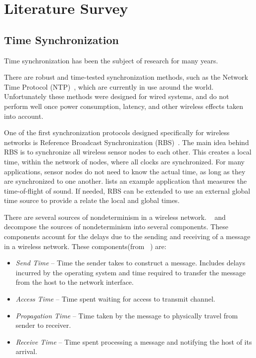 \section{Literature Survey}\label{section:litsurvey}
\subsection{Time Synchronization}
Time synchronization has been the subject of research for many years.

There are robust and time-tested synchronization methods, such as the Network Time Protocol (NTP)~\cite{synchronization:NTP}, which are currently in use around the world. Unfortunately these methods were designed for wired systems, and do not perform well once power consumption, latency, and other wireless effects taken into account. 

One of the first synchronization protocols designed specifically for wireless networks is Reference Broadcast Synchronization (RBS)~\cite{synchronization:RBS}. The main idea behind RBS is to synchronize all wireless sensor nodes to each other. This creates a local time, within the network of nodes, where all clocks are synchronized. For many applications, sensor nodes do not need to know the actual time, as long as they are synchronized to one another. \cite{synchronization:RBS} lists an example application that measures the time-of-flight of sound. If needed, RBS can be extended to use an external global time source to provide a relate the local and global times.

There are several sources of nondeterminism in a wireless network. ~\cite{synchronization:RBS} and ~\cite{synchronization:FTSP} decompose the sources of nondeterminism into several components. These components account for the delays due to the sending and receiving of a message in a wireless network. These components(from ~\cite{synchronization:RBS}) are: 
\begin{itemize}
\item \emph{Send Time} -- Time the sender takes to construct a message. Includes delays incurred by the operating system and time required to transfer the message from the host to the network interface.
\item \emph{Access Time} -- Time spent waiting for access to transmit channel.
\item \emph{Propagation Time} -- Time taken by the message to physically travel from sender to receiver.
\item \emph{Receive Time} -- Time spent processing a message and notifying the host of its arrival.
\end{itemize}

